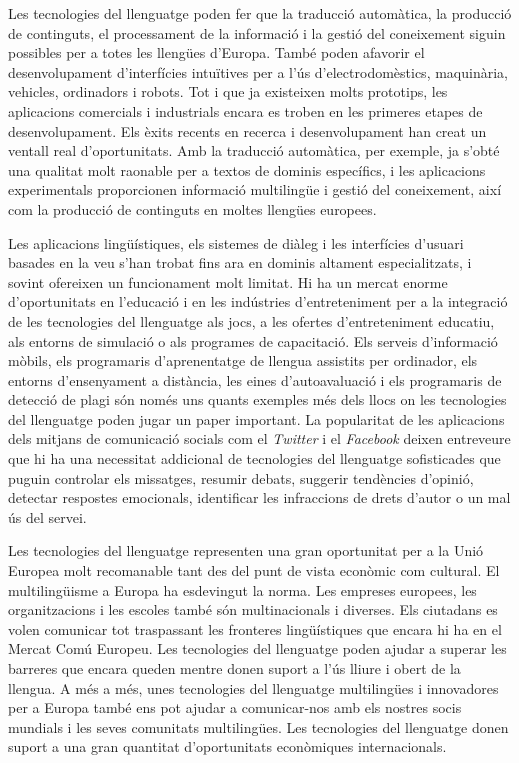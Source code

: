 \begin{multicols}{2}
Les tecnologies del llenguatge poden fer que la traducció automàtica, la producció de continguts, el processament de la informació i la gestió del coneixement siguin possibles per a totes les llengües d’Europa. També poden afavorir el desenvolupament d’interfícies intuïtives  per a l'ús d'electrodomèstics, maquinària, vehicles, ordinadors i robots. Tot i que ja existeixen molts prototips, les aplicacions comercials i industrials encara es troben en les primeres etapes de desenvolupament. Els èxits recents en recerca i desenvolupament han creat un ventall real d’oportunitats. Amb la traducció automàtica, per exemple, ja s’obté una qualitat molt raonable per a textos de dominis específics, i les aplicacions experimentals proporcionen informació multilingüe i gestió del coneixement, així com la producció de continguts en moltes llengües europees.

Les aplicacions lingüístiques, els sistemes de diàleg i les interfícies d’usuari basades en la veu s’han trobat fins ara en dominis altament especialitzats, i sovint ofereixen un funcionament molt limitat. Hi ha un mercat enorme d’oportunitats en l’educació i en les indústries d’entre\-te\-ni\-ment per a la integració de les tecnologies del llenguatge als jocs, a les ofertes d'entre\-te\-ni\-ment educatiu, als entorns de simulació o als programes de capacitació. Els serveis d’informació mòbils, els programaris d’aprenentatge de llengua assistits per ordinador, els entorns d’ensenyament a distància, les eines d’autoavaluació i els programaris de detecció de plagi són només uns quants exemples més dels llocs on les tecnologies del llenguatge poden jugar un paper important. La popularitat de les aplicacions dels mitjans de comunicació socials com el \textit{Twitter} i el \textit{Facebook} deixen entreveure que hi ha una necessitat addicional de tecnologies del llenguatge sofisticades que puguin controlar els missatges, resumir debats, suggerir tendències d’opinió, detectar respostes emocionals, identificar les infraccions de drets d’autor o un mal ús del servei. 

Les tecnologies del llenguatge representen una gran oportunitat per a la Unió Europea molt recomanable tant des del punt de vista econòmic com cultural.  El multilingüisme a Europa ha esdevingut la norma.  Les empreses europees, les organitzacions i les escoles també són multinacionals i diverses. Els ciutadans es volen comunicar tot traspassant les fronteres lingüístiques que encara hi ha en el Mercat Comú Europeu. Les tecnologies del llenguatge poden ajudar a superar les barreres que encara queden mentre donen suport a l’ús lliure i obert de la llengua. A més a més, unes tecnologies del llenguatge multilingües i innovadores per a Europa també ens pot ajudar a comunicar-nos amb els nostres socis mundials i les seves comunitats multilingües. Les tecnologies del llenguatge donen suport a una gran quantitat d’oportunitats econòmiques internacionals.


\end{multicols}

